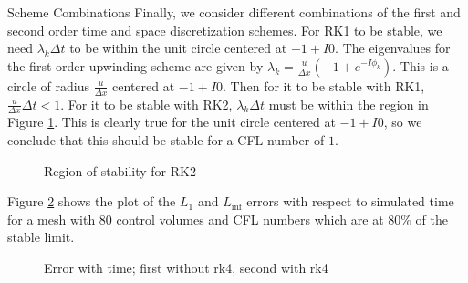 \documentclass{article}
\begin{document}
\begin{section}{Scheme Combinations}
Finally, we consider different combinations of the first and second order
time and space discretization schemes.
For RK1 to be stable,
we need $\lambda_k \Delta t$ to be within the unit circle centered at $-1 + I 0$.
The eigenvalues for the first order upwinding scheme are given by
$\lambda_k = \frac{u}{\Delta x} (-1 + e^{-I \phi_k})$.
This is a circle of radius $\frac{u}{\Delta x}$ centered at $-1 + I 0$.
Then for it to be stable with RK1, $\frac{u}{\Delta x} \Delta t < 1$.
For it to be stable with RK2,
$\lambda_k \Delta t$ must be within the region in Figure \ref{rk2_region}.
This is clearly true for the unit circle centered at $-1 + I 0$,
so we conclude that this should be stable for a CFL number of $1$.

\begin{figure}[ht!]
  \caption{Region of stability for RK2}
  \label{rk2_region}
\end{figure}

Figure \ref{time_errs} shows the plot of the $L_1$ and $L_{\inf}$ errors
with respect to simulated time for a mesh with 80 control volumes and
CFL numbers which are at $80\%$ of the stable limit.

\begin{figure}[ht]
  \caption{Error with time; first without rk4, second with rk4}
  \label{time_errs}
\end{figure}


\end{section}
\end{document}
